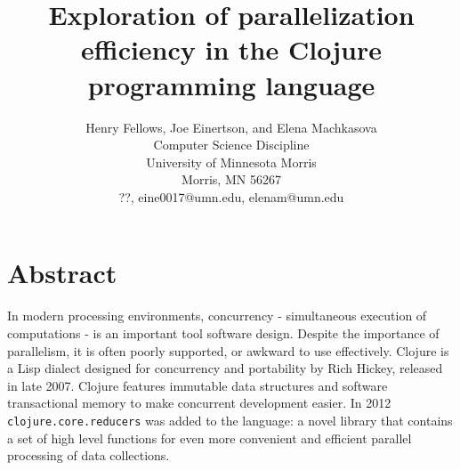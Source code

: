 \documentclass[12pt]{article}
\newcommand{\comment}[1]{{\bf \tt  {#1}}}
\newcommand{\clocode}[1]{{\texttt {#1}}}
\begin{document}
\pagestyle{plain}
%




\title{Exploration of parallelization efficiency in the Clojure programming language}
%
%




\author{
Henry Fellows, Joe Einertson, and Elena Machkasova \\
Computer Science Discipline \\
University of Minnesota Morris\\
Morris, MN 56267\\
??, eine0017@umn.edu, elenam@umn.edu
}




\date{}




\maketitle
\thispagestyle{empty}


\section*{\centering Abstract}
In modern processing environments, concurrency - simultaneous execution of computations - is an important tool software design. Despite the importance of parallelism, it is often poorly supported, or awkward to use effectively. Clojure is a Lisp dialect designed for concurrency and portability by Rich Hickey, released in late 2007. Clojure features immutable data structures and software transactional memory to make concurrent development easier. In 2012 \clocode{clojure.core.reducers} was added to the language: a novel library that contains a set of high level functions for even more convenient and efficient parallel processing of data collections. 
\end{document}
